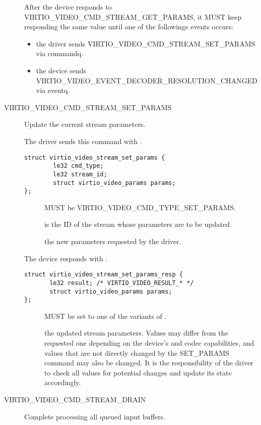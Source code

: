 \begin{description}
After the device responds to VIRTIO_VIDEO_CMD_STREAM_GET_PARAMS, it MUST keep
responding the same value until one of the followings events occurs:
\begin{itemize}
\item the driver sends VIRTIO_VIDEO_CMD_STREAM_SET_PARAMS via commandq.
\item the device sends VIRTIO_VIDEO_EVENT_DECODER_RESOLUTION_CHANGED via eventq.
\end{itemize}

\item[VIRTIO_VIDEO_CMD_STREAM_SET_PARAMS] Update the current stream parameters.

The driver sends this command with .
\begin{lstlisting}
struct virtio_video_stream_set_params {
        le32 cmd_type;
        le32 stream_id;
        struct virtio_video_params params;
};
\end{lstlisting}
\begin{description}
\item[] MUST be VIRTIO_VIDEO_CMD_TYPE_SET_PARAMS.
\item[] is the ID of the stream whose parameters are to be
  updated.
\item[] the new parameters requested by the driver.
\end{description}

The device responds with .
\begin{lstlisting}
struct virtio_video_stream_set_params_resp {
       le32 result; /* VIRTIO_VIDEO_RESULT_* */
       struct virtio_video_params params;
};
\end{lstlisting}
\begin{description}
\item[] MUST be set to one of the variants of .
\item[] the updated stream parameters. Values may differ from the
    requested one depending on the device's and codec capabilities, and values
    that are not directly changed by the SET_PARAMS command may also be changed.
    It is the responsibility of the driver to check all values for potential
    changes and update its state accordingly.
\end{description}

\item[VIRTIO_VIDEO_CMD_STREAM_DRAIN] Complete processing all queued input
  buffers.


\end{description}
